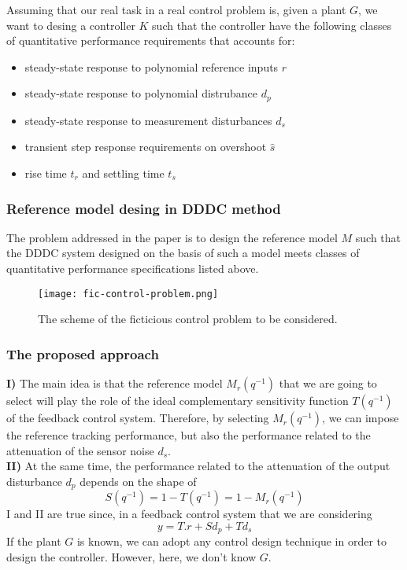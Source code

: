 Assuming that our real task in a real control problem is, given a plant $G$, we want to desing a controller $K$ such that the controller have the following classes of quantitative performance requirements that accounts for:
\begin{itemize}
    \item steady-state response to polynomial reference inputs $r$
    \item steady-state response to polynomial distrubance $d_p$ 
    \item steady-state response to measurement disturbances $d_s$
    \item transient step response requirements on overshoot $\hat{s}$
    \item rise time $t_r$ and settling time $t_s$
\end{itemize}

 \subsubsection{Reference model desing in DDDC method}
 The problem addressed in the paper is to design the reference model $M$ such that the DDDC system designed on the basis of such a model meets classes of quantitative performance specifications listed above.
 
 \begin{figure}[H]
    \centering \texttt{[image: fic-control-problem.png]}
    \caption{The scheme of the ficticious control problem to be considered.}
 \end{figure}
 
 \subsubsection{The proposed approach}
\textbf{ I) }The main idea is that the reference model $M_r(q^{-1})$ that we are going to select will play the role of the ideal complementary sensitivity function $T(q^{-1})$ of the feedback control system. Therefore, by selecting $M_r(q^{-1})$, we can impose the reference tracking performance, but also the performance related to the attenuation of the sensor noise $d_s$.\\
 
 \textbf{II)} At the same time,  the performance related to the attenuation of the output disturbance $d_p$ depends on the shape of \\
 \[
 S(q^{-1}) = 1 - T(q^{-1}) = 1 - M_r(q^{-1})
 \]
 I and II are true since, in a feedback control system that we are considering\\
 \[
 y = T.r + Sd_p + Td_s
 \]
 If the plant $G$ is known, we can adopt any control design technique in order to design the controller. However, here, we don't know $G$. \\
  
